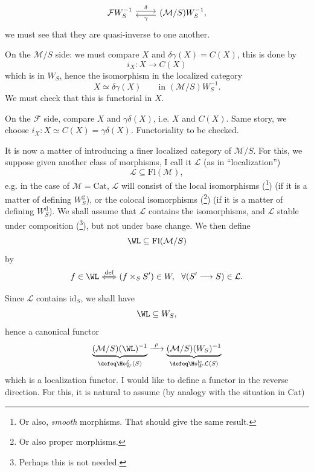 \[
\begin{tikzcd}
\mathcal{F}W_S^{-1} \arrow[r, shift left, "\delta"] & (\mathcal{M}/S)W_S^{-1}, \arrow[l, shift left, "\gamma"]
\end{tikzcd}
\]
we must see that they are quasi-inverse to one  another.

On the $\mathcal{M}/S$ side: we must compare $X$ and $\delta\gamma(X) = C(X)$, this is done by
\[
i_X : X \longrightarrow C(X)
\]
which is in $W_S$, hence the isomorphism in the localized category
\[
X \simeq \delta\gamma(X) \qquad \text{in } (\mathcal{M}/S)W_S^{-1}.
\]
We must check that this is functorial in $X$.

On the $\mathcal{F}$ side, compare $X$ and $\gamma\delta(X)$, i.e. $X$ and $C(X)$. Same story, we choose $i_X : X \simeq C(X) = \gamma\delta(X)$. Functoriality to be checked.

It is now a matter of introducing a finer localized category of $\mathcal{M}/S$. For this, we suppose given another class of morphisms, I call it $\mathcal{L}$ (as in ``localization'')
\[
\mathcal{L} \subseteq \mathrm{Fl}(\mathcal{M}),
\]
e.g. in the case of $\mathcal{M} = \mathrm{Cat}$, $\mathcal{L}$ will consist of the local isomorphisms (\footnote[55]{Or also, \textit{smooth} morphisms. That should give the same result.}) (if it is a matter of defining $W_S^{\mathrm{g}}$), or the colocal isomorphisms (\footnote[56]{Or also proper morphisms.}) (if it is a matter of defining $W_S^{\mathrm{d}}$). We shall assume that $\mathcal{L}$ contains the isomorphisms, and $\mathcal{L}$ stable under composition (\footnote[57]{Perhaps this is not needed.}), but not under base change. We then define
\[
\WL \subseteq \mathrm{Fl}(\mathcal{M}/S)
\]
by
\[
f \in \WL \overset{\text{def}}{\Longleftrightarrow} (f \times_S S') \in W,\ \ \forall (S' \longrightarrow S) \in \mathcal{L}.
\]

Since $\mathcal{L}$ contains $\mathrm{id}_S$, we shall have
\[
\WL \subseteq W_S,
\]
hence a canonical functor
\[
\underbrace{(\mathcal{M}/S)(\WL)^{-1}}_{\defeq \Ho_W^{\mathcal{L}}(S)} \xrightarrow{\ \rho\ } \underbrace{(\mathcal{M}/S)(W_S)^{-1}}_{\defeq \Ho_W^{\mathrm{lc}}\mathcal{L}(S)} %
\]
which is a localization functor. I would like to define a functor in the reverse direction. For this, it is natural to assume (by analogy with the situation in Cat)

